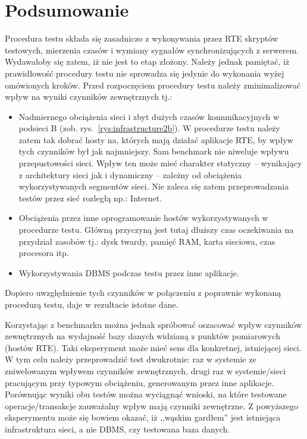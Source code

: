 \section{Podsumowanie}
Procedura testu składa się zasadniczo z wykonywania przez RTE skryptów testowych,
mierzenia czasów i wymiany sygnałów synchronizujących z serwerem. Wydawałoby się zatem, 
iż nie jest to etap złożony. Należy jednak pamiętać, iż prawidłowość procedury testu
nie sprowadza się jedynie do wykonania wyżej omówionych kroków. Przed rozpoczęciem procedury
testu należy zminimalizować wpływ na wyniki czynników zewnętrznych tj.:
\begin{itemize}
\item Nadmiernego obciążenia sieci i zbyt dużych czasów komunikacyjnych w podsieci B (zob. rys.~\ref{rys:infrastructure2b}).
W procedurze testu należy zatem tak dobrać hosty na, których mają działać aplikacje RTE,
by wpływ tych czynników był jak najmniejszy. Sam benchmark nie niweluje wpływu przepustowości
sieci. Wpływ ten może mieć charakter statyczny -- wynikający z architektury sieci jak i dynamiczny
-- zależny od obciążenia wykorzystywanych segmentów sieci. Nie zaleca się zatem przeprowadzania
testów przez sieć rozległą np.: Internet.
\item Obciążenia przez inne oprogramowanie hostów wykorzystywanych w procedurze testu.
Główną przyczyną jest tutaj dłuższy czas oczekiwania na przydział zasobów tj.: 
dysk twardy, pamięć RAM, karta sieciowa, czas procesora itp.
\item Wykorzystywania DBMS podczas testu przez inne aplikacje.
\end{itemize}
Dopiero uwzględnienie tych czynników w połączeniu z poprawnie wykonaną procedurą testu,
daje w rezultacie istotne dane. 

Korzystając z benchmarku można jednak spróbować oszacować wpływ czynników zewnętrznych 
na wydajność bazy danych widzianą z punktów pomiarowych (hostów RTE). Taki eksperyment
może mieć sens dla konkretnej, istniejącej sieci. W tym celu należy przeprowadzić test dwukrotnie: 
raz w systemie ze zniwelowanym wpływem czynników zewnętrznych, drugi raz w systemie/sieci 
pracującym przy typowym obciążeniu, generowanym przez inne aplikacje. 
Porównując wyniki obu testów można wyciągnąć wnioski,
na które testowane operacje/transakcje zauważalny wpływ mają czynniki zewnętrzne.
Z powyższego eksperymentu może się bowiem okazać, iż ,,wąskim gardłem'' jest 
istniejąca infrastruktura sieci, a nie DBMS, czy testowana baza danych.



